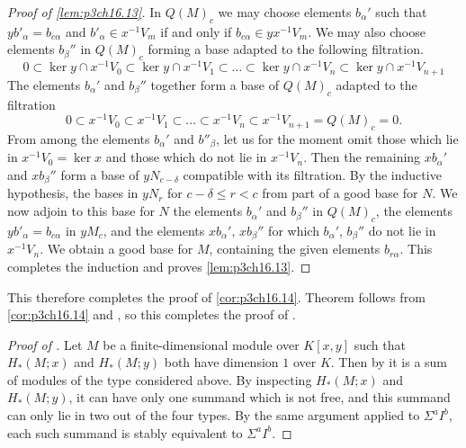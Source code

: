 \documentclass[../main]{subfiles}
\begin{document}
\begin{proof}[Proof of \ref{lem:p3ch16.13}]
In $Q(M)_c$ we may choose elements $b_\alpha'$ such that $y b'_\alpha = b_{c \alpha}$ and $b'_\alpha \in x^{-1} V_m$ if and only if $b_{c \alpha} \in y x^{-1} V_m$. We may also choose elements $b_\beta''$ in $Q(M)_c$ forming a base adapted to the following filtration. $$0 \subset \ker y \cap x^{-1} V_0 \subset \ker y \cap x^{-1} V_1 \subset \ldots \subset \ker y \cap x^{-1} V_n \subset \ker y \cap x^{-1} V_{n + 1}$$ The elements $b_\alpha'$ and $b_\beta''$ together form a base of $Q(M)_c$ adapted to the filtration $$0 \subset x^{-1} V_0 \subset x^{-1} V_1 \subset \ldots \subset x^{-1} V_n \subset x^{-1} V_{n + 1} = Q(M)_c = 0.$$ From among the elements $b_\alpha'$ and $b''_\beta$, let us for the moment omit those which lie in $x^{-1} V_0 = \ker x$ and those which do not lie in $x^{-1} V_n$. Then the remaining $x b_\alpha'$ and $x b_\beta''$ form a base of $y N_{c - \delta}$ compatible with its filtration. By the inductive hypothesis, the bases in $y N_r$ for $c - \delta \le r < c$ from part of a good base for $N$. We now adjoin to this base for $N$ the elements $b_\alpha'$ and $b_\beta''$ in $Q(M)_c$, the elements $y b'_\alpha = b_{c \alpha}$ in $y M_c$, and the elements $x b_\alpha'$, $x b_\beta''$ for which $b_\alpha'$, $b_\beta''$ do not lie in $x^{-1} V_n$. We obtain a good base for $M$, containing the given elements $b_{r \alpha}$. This completes the induction and proves \ref{lem:p3ch16.13}.
\end{proof}

This therefore completes the proof of \ref{cor:p3ch16.14}. Theorem  follows from \ref{cor:p3ch16.14} and , so this completes the proof of . 

\begin{proof}[Proof of ]
Let $M$ be a finite-dimensional module over $K[x, y]$ such that $H_\ast(M; x)$ and $H_\ast(M; y)$ both have dimension $1$ over $K$. Then by  it is a sum of modules of the type considered above. By inspecting $H_\ast(M; x)$ and $H_\ast(M; y)$, it can have only one summand which is not free, and this summand can only lie in two out of the four types. By the same argument applied to $\Sigma^a I^b$, each such summand is stably equivalent to $\Sigma^a I^b$. 
\end{proof}
\end{document}
